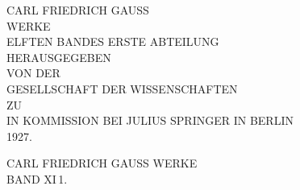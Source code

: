 \clearpage\begingroup\NoSourceHead{}
\begin{center}
\vspace*{.65in}
{\Large CARL FRIEDRICH GAUSS}\\[.4in]
{\Huge WERKE}\\[.5in]
{\large ELFTEN BANDES ERSTE ABTEILUNG}\\[.55in]
{\small HERAUSGEGEBEN}\\[.3in]
{\small VON DER}\\[.3in]
GESELLSCHAFT DER WISSENSCHAFTEN\\[.3in]
{\small ZU}\\[.3in]
{\Large{}}
\vfill
IN KOMMISSION BEI JULIUS SPRINGER IN BERLIN\\[.15in]
1927.
\end{center}
\clearpage{}\NoSourceHead
\begin{center}
\vspace*{2.3in}
{\Large CARL FRIEDRICH GAUSS WERKE}\\[.5in]
{\large BAND XI\,{\normalsize 1}.}
\end{center}
\clearpage\endgroup
